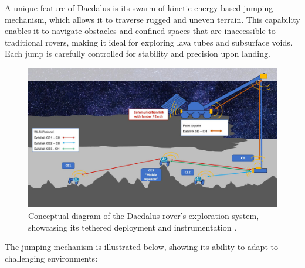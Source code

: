A unique feature of Daedalus is its swarm of kinetic energy-based jumping mechanism, which allows it to traverse rugged and uneven terrain. This capability enables it to navigate obstacles and confined spaces that are inaccessible to traditional rovers, making it ideal for exploring lava tubes and subsurface voids. Each jump is carefully controlled for stability and precision upon landing.

\begin{figure}[H]
    \centering
    \includegraphics[width=0.66\linewidth]{daedalus-schema.png}
    \caption{Conceptual diagram of the Daedalus rover’s exploration system, showcasing its tethered deployment and instrumentation \cite{esa-daedalus}.}
    \label{fig:daedalus-mission-schema}
\end{figure}

The jumping mechanism is illustrated below, showing its ability to adapt to challenging environments:

